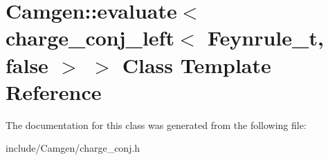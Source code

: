 \hypertarget{a00147}{}\section{Camgen\+:\+:evaluate$<$ charge\+\_\+conj\+\_\+left$<$ Feynrule\+\_\+t, false $>$ $>$ Class Template Reference}
\label{a00147}


The documentation for this class was generated from the following file\+:\begin{DoxyCompactItemize}
\item 
include/\+Camgen/charge\+\_\+conj.\+h\end{DoxyCompactItemize}
